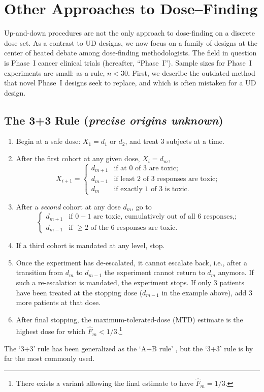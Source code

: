 \chapter{Other Approaches to Dose--Finding}\label{sec:other}

Up-and-down procedures are not the only approach to dose-finding on a discrete dose set. As a contrast to UD designs, we now focus on a family of designs at the center of heated debate among dose-finding methodologists. The field in question is Phase~I cancer clinical trials (hereafter, ``Phase~I''). Sample sizes for Phase~I experiments are small: as a rule, $n<30$. First, we describe the outdated method that novel Phase~I designs seek to replace, and which is often \citep{Rogat:etal:oped:2007,Zack:stag:2009} mistaken for a UD design.

\section{The 3+3 Rule (\emph{precise origins unknown})}
%
\begin{enumerate}
\item Begin at a safe dose: $X_1=d_1$ or $d_2$, and treat 3 subjects at a time.
\item After the first cohort at any given dose, $X_i=d_m$,
\begin{equation*}
X_{i+1}=
\begin{cases}
    d_{m+1} &\textrm{if at $0$ of $3$ are toxic;}\\
    d_{m-1} &\textrm{if least $2$ of $3$ responses are toxic;} \\
    d_m &\textrm{if exactly $1$ of $3$ is toxic.}
\end{cases}
\end{equation*}
\item After a \emph{second} cohort at any dose $d_m$, go to
\begin{equation*}
\begin{cases}
    d_{m+1} &\textrm{if $0-1$ are toxic, cumulatively out of all $6$ responses,;}\\
    d_{m-1} &\textrm{if $\geq 2$ of the $6$ responses are toxic.}
\end{cases}
\end{equation*}
\item If a third cohort is mandated at any level, stop.
\item Once the experiment has de-escalated, it cannot escalate back, i.e., after a transition from $d_m$ to $d_{m-1}$ the experiment cannot return to $d_m$ anymore. If such a re-escalation is mandated, the experiment stops. If only $3$ patients have been treated at the stopping dose ($d_{m-1}$ in the example above), add $3$ more patients at that dose.
\item After final stopping, the maximum-tolerated-dose (MTD) estimate is the highest dose for which $\hat{F}_m<1/3$.\footnote{There exists a variant allowing the final estimate to have $\hat{F}_m=1/3$.}
\end{enumerate}
%
\noindent The `3+3' rule has been generalized as the `A+B rule' \citep{Lin:Shih:stat:2001}, but the `3+3' rule is by far the most commonly used.

